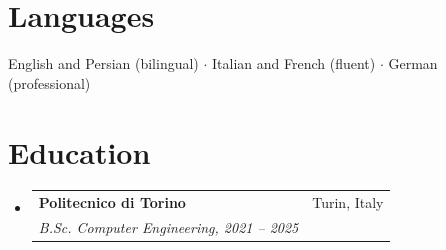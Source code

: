 \documentclass[10pt,a4paper]{article}
\makeatletter
\newcommand{\resumeSubheading}[4]{
  \vspace{-2pt}\item
    \begin{tabular*}{0.97\textwidth}[t]{l@{\extracolsep{\fill}}r}
      \textbf{#1} & #2 \\
      \textit{\small#3} & \textit{\small #4} \\
    \end{tabular*}\vspace{-7pt}
}
\newcommand{\resumeSubHeadingListStart}{\begin{itemize}[leftmargin=0.15in, label={}]}
\newcommand{\resumeSubHeadingListEnd}{\end{itemize}}
\makeatother
\begin{document}
\section{Languages}
 \begin{itemize}[leftmargin=0.15in, label={}]
    \small{\item{
     English and Persian (bilingual) $\cdot$ Italian and French (fluent) $\cdot$ German (professional)
    }}
 \end{itemize}

\section{Education}
\resumeSubHeadingListStart
  \resumeSubheading
    {Politecnico di Torino}{Turin, Italy}
    {B.Sc. Computer Engineering, 2021 -- 2025}{}
\resumeSubHeadingListEnd
\end{document}
